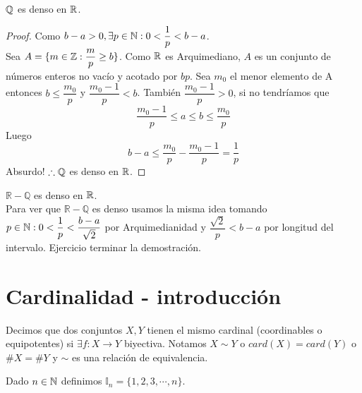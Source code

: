 \begin{eg}
    $\mathbb{Q}$ es denso en $\mathbb{R}$.
    \begin{proof}
        Como $b-a>0, \exists p\in \mathbb{N}: 0 < \dfrac{1}{p}<b-a$. \\
        Sea $A = \{ m \in \mathbb{Z}: \dfrac{m}{p} \geq b \}$. Como $\mathbb{R}$ es Arquimediano, $A$ es un conjunto de números enteros no vacío y acotado por $bp$. Sea $m_0$ el menor elemento de A entonces $b\leq \dfrac{m_0}{p}$ y $\dfrac{m_0-1}{p} <b$. También $\dfrac{m_0-1}{p} > 0$, si no tendríamos que 
        \begin{equation}
            \dfrac{m_0-1}{p} \leq a \leq b \leq \dfrac{m_0}{p}
        \end{equation}
        Luego
        \begin{equation}
            b-a \leq \dfrac{m_0}{p} - \dfrac{m_0-1}{p} = \dfrac1p
        \end{equation}
        Absurdo! $\therefore \mathbb{Q}$ es denso en $\mathbb{R}$.
    \end{proof}
\end{eg}

\begin{eg}
    $\mathbb{R-Q}$ es denso en $\mathbb{R}$. \\
    Para ver que $\mathbb{R-Q}$ es denso usamos la misma idea tomando $p \in \mathbb{N} :0<\dfrac1p<\dfrac{b-a}{\sqrt2}$ por Arquimedianidad y $\dfrac{\sqrt2}{p} < b-a$ por longitud del intervalo. 
    Ejercicio terminar la demostración.
\end{eg}

\section{Cardinalidad - introducción}

\begin{definition}
    Decimos que dos conjuntos $X, Y$ tienen el mismo cardinal (coordinables o equipotentes) si $\exists f: X \to Y$ biyectiva. Notamos $X \sim Y$ o $card(X) = card(Y)$ o $\#X=\#Y$ y $\sim$ es una relación de equivalencia.
\end{definition}

Dado $n \in \mathbb{N}$ definimos $\mathbb{I}_n = \{1, 2, 3,\cdots, n\}$.


